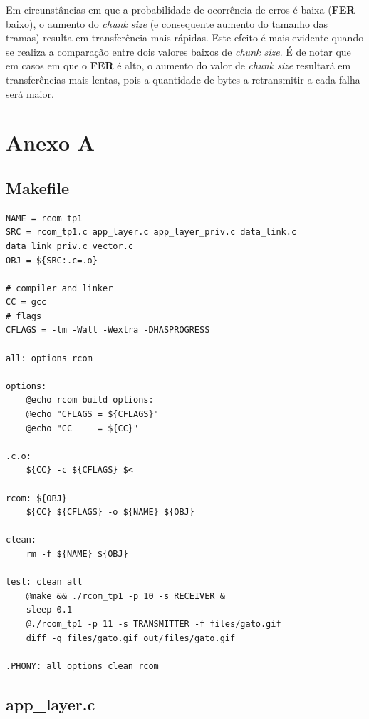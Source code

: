 \documentclass[11pt]{report}
\begin{document}
Em circunstâncias em que a probabilidade de ocorrência de erros é baixa
(\textbf{FER} baixo), o aumento do \textit{chunk size} (e consequente aumento
do tamanho das tramas) resulta em transferência mais rápidas. Este efeito é
mais evidente quando se realiza a comparação entre dois valores baixos de
\textit{chunk size}. É de notar que em casos em que o \textbf{FER} é alto,
o aumento do valor de \textit{chunk size} resultará em transferências mais
lentas, pois a quantidade de bytes a retransmitir a cada falha será maior.

\chapter*{Anexo A}

\section{Makefile}

\begin{lstlisting}
NAME = rcom_tp1
SRC = rcom_tp1.c app_layer.c app_layer_priv.c data_link.c data_link_priv.c vector.c
OBJ = ${SRC:.c=.o}

# compiler and linker
CC = gcc
# flags
CFLAGS = -lm -Wall -Wextra -DHASPROGRESS

all: options rcom

options:
	@echo rcom build options:
	@echo "CFLAGS = ${CFLAGS}"
	@echo "CC     = ${CC}"

.c.o:
	${CC} -c ${CFLAGS} $<

rcom: ${OBJ}
	${CC} ${CFLAGS} -o ${NAME} ${OBJ}

clean:
	rm -f ${NAME} ${OBJ}

test: clean all
	@make && ./rcom_tp1 -p 10 -s RECEIVER &
	sleep 0.1
	@./rcom_tp1 -p 11 -s TRANSMITTER -f files/gato.gif
	diff -q files/gato.gif out/files/gato.gif

.PHONY: all options clean rcom
\end{lstlisting}

\section{app\_layer.c}
\end{document}
